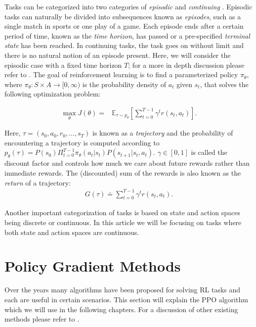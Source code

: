 Tasks can be categorized into two categories of \textit{episodic} and \textit{continuing} \cite{rlbook}. Episodic tasks can naturally be divided into subsequences known as \textit{episodes}, such as a single match in sports or one play of a game. Each episode ends after a certain period of time, known as the \textit{time horizon}, has passed or a pre-specified \textit{terminal state} has been reached. In continuing tasks, the task goes on without limit and there is no natural notion of an episode present. Here, we will consider the episodic case with a fixed time horizon $T$; for a more in depth discussion please refer to \cite{rlbook}. The goal of reinforcement learning is to find a parameterized policy $\pi_\theta$, where $\pi_\theta: S \times A \to [0, \infty)$ is the probability density of $a_t$ given $s_t$, that solves the following optimization problem:

\begin{align}
\label{eq:return}
\mathop{\mathrm{max}}_\theta J(\theta) = &\mathbb{E}_{\tau\sim p_\theta}\left[\sum_{t=0}^{T-1}\gamma^t{r({s}_t, {a}_t)} \right].
\end{align}

Here, $\tau = (s_0, a_0, r_0, \dots, s_T)$ is known as a \textit{trajectory} and the probability of encountering a trajectory is computed according to $p_\theta(\tau) = P(s_0) \Pi_{t=0}^{T-1} \pi_\theta(a_t|s_t) P(s_{t+1}|s_t,a_t)$. $\gamma \in [0,1]$ is called the discount factor and controls how much we care about future rewards rather than immediate rewards. The (discounted) sum of the rewards is also known as the \textit{return} of a trajectory:
\begin{align*}
    G(\tau) \doteq \sum_{t=0}^{T-1}\gamma^t{r({s}_t, {a}_t)}.
\end{align*}

Another important categorization of tasks is based on state and action spaces being discrete or continuous. In this article we will be focusing on tasks where both state and action spaces are continuous.

\section{Policy Gradient Methods}
\label{sec:background_pg}

Over the years many algorithms have been proposed for solving \ac{RL} tasks and each are useful in certain scenarios. This section will explain the \ac{PPO} algorithm which we will use in the following chapters. For a discussion of other existing methods please refer to \cite{rl_survey}.

